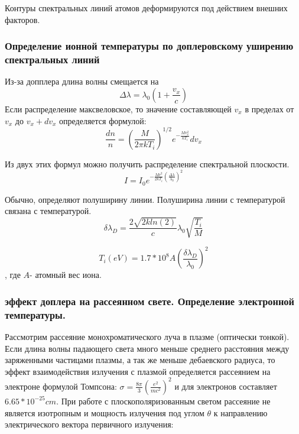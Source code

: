 \documentclass[10pt, a4paper]{article}
\begin{document}
Контуры спектральных линий атомов деформируются под действием внешних факторов.
\subsubsection{Определение ионной температуры по доплеровскому уширению спектральных линий}
\label{11.2.3.1}



Из-за допплера длина волны смещается на 
\begin{equation}
	\Delta \lambda = \lambda_0 (1+\frac{v_x}{c})
\end{equation}
Если распределение максвеловское, то  значение составляющей $v_x$  в пределах от  $v_x$  до $v_x + dv_x$ определяется формулой:
\begin{equation}
	\frac{dn}{n}=(\frac{M}{2\pi kT_i})^{1/2} e^{-\frac{Mv^{2}_x}{kT_i}} dv_x
\end{equation}

Из двух этих формул можно получить распределение спектральной плоскости.
\begin{equation}
	I=I_0 e^{-\frac{Mc^{2}}{2kT_i} (\frac{\Delta \lambda}{\lambda_0})^{2}}
\end{equation}

Обычно, определяют полуширину линии. Полуширина линии с температурой связана с температурой.
\begin{equation}
	\delta \lambda_D=\frac{2 \sqrt{2k ln(2)}}{c} \lambda_0 \sqrt{\frac{T_i}{M}}
\end{equation}


\begin{equation}
	T_i(eV)=1.7*10^{8}A(\frac{\delta \lambda_D}{\lambda_0})^{2}
\end{equation}
, где $A$- атомный вес иона.

\subsubsection{эффект доплера на рассеянном свете. Определение электронной температуры.}
\label{11.2.3.2}

Рассмотрим рассеяние монохроматического луча в плазме (оптически тонкой). Если длина волны падающего света много меньше среднего расстояния между заряженными частицами плазмы, а так же меньше дебаевского радиуса, то эффект взаимодействия излучения с плазмой определяется рассеянием на электроне формулой Томпсона: $\sigma =\frac{8\pi}{3} (\frac{e^{2}}{mc^{2}})^{2}$ и для электронов составляет $6.65*10^{-25} cm$.
При работе с плоскополяризованным светом рассеяние не является изотропным и мощность излучения под углом $\theta$ к направлению электрического вектора первичного излучения:
\end{document}
